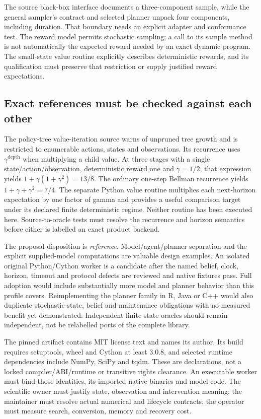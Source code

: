 The source black-box interface documents a three-component sample, while the
general sampler's contract and selected planner unpack four components,
including duration. That boundary needs an explicit adapter and conformance
test. The reward model permits stochastic sampling; a call to its sample method
is not automatically the expected reward needed by an exact dynamic program.
The small-state value routine explicitly describes deterministic rewards, and
its qualification must preserve that restriction or supply justified reward
expectations. \citep{exec23_pomdppy_sources}

\subsection{Exact references must be checked against each other}
\label{exec23:pomdppy-decision}
The policy-tree value-iteration source warns of unpruned tree growth and is
restricted to enumerable actions, states and observations. Its recurrence uses
$\gamma^{\text{depth}}$ when multiplying a child value. At three stages with a
single state/action/observation, deterministic reward one and $\gamma=1/2$, that
expression yields $1+\gamma(1+\gamma^2)=13/8$. The ordinary one-step Bellman
recurrence yields $1+\gamma+\gamma^2=7/4$. The separate Python value routine
multiplies each next-horizon expectation by one factor of gamma and provides
a useful comparison target under its declared finite deterministic regime.
Neither routine has been executed here. Source-to-oracle tests must resolve
the recurrence and horizon semantics before either is labelled an exact
product backend. \citep{exec23_pomdppy_sources,exec23_pomdppy_reference}

The proposal disposition is \emph{reference}. Model/agent/planner separation
and the explicit supplied-model computations are valuable design examples.
An isolated original Python/Cython worker is a candidate after the named belief,
clock, horizon, timeout and protocol defects are reviewed and native fixtures
pass. Full adoption would include substantially more model and planner behavior
than this profile covers. Reimplementing the planner family in R, Java or C++
would also duplicate stochastic-state, belief and maintenance obligations with
no measured benefit yet demonstrated. Independent finite-state oracles should
remain independent, not be relabelled ports of the complete library.

The pinned artifact contains MIT license text and names its author. Its build
requires setuptools, wheel and Cython at least 3.0.8, and selected runtime
dependencies include NumPy, SciPy and tqdm. These are declarations, not a
locked compiler/ABI/runtime or transitive rights clearance. An executable worker
must bind those identities, its imported native binaries and model code. The
scientific owner must justify state, observation and intervention meaning; the
maintainer must resolve actual numerical and lifecycle contracts; the operator
must measure search, conversion, memory and recovery cost.
\citep{exec23_pomdppy_sources}

